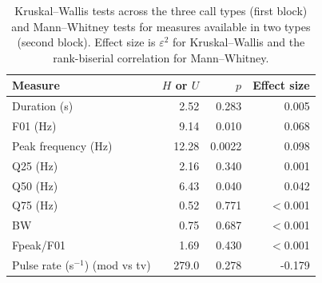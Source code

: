 \begin{table}[!ht]
\centering
\caption{Kruskal--Wallis tests across the three call types (first block) and Mann--Whitney tests for measures available in two types (second block). Effect size is $\varepsilon^2$ for Kruskal--Wallis and the rank-biserial correlation for Mann--Whitney.}
\label{tab:p1tests}
\small
\begin{tabular}{lrrr}
\toprule
Measure & $H$ or $U$ & $p$ & Effect size \\
\midrule
Duration (s) & 2.52 & 0.283 & 0.005 \\
F01 (Hz) & 9.14 & 0.010 & 0.068 \\
Peak frequency (Hz) & 12.28 & 0.0022 & 0.098 \\
Q25 (Hz) & 2.16 & 0.340 & 0.001 \\
Q50 (Hz) & 6.43 & 0.040 & 0.042 \\
Q75 (Hz) & 0.52 & 0.771 & $<$0.001 \\
BW & 0.75 & 0.687 & $<$0.001 \\
Fpeak/F01 & 1.69 & 0.430 & $<$0.001 \\
Pulse rate (s$^{-1}$) (mod vs tv) & 279.0 & 0.278 & -0.179 \\
\bottomrule
\end{tabular}
\end{table}